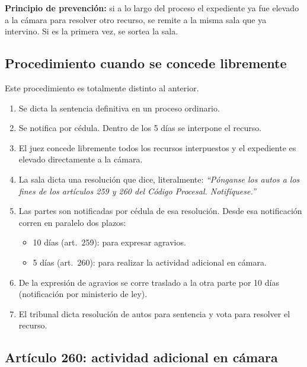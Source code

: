\documentclass[12pt,oneside]{book}
\begin{document}
\begin{note}
\textbf{Principio de prevenci\'on:} si a lo largo del proceso el expediente ya fue elevado a la c\'amara para resolver otro recurso, se remite a la misma sala que ya intervino. Si es la primera vez, se sortea la sala.
\end{note}

\subsection{Procedimiento cuando se concede libremente}

Este procedimiento es totalmente distinto al anterior.

\begin{enumerate}
    \item Se dicta la sentencia definitiva en un proceso ordinario.
    \item Se notifica por c\'edula. Dentro de los 5 d\'ias se interpone el recurso.
    \item El juez concede libremente todos los recursos interpuestos y el expediente es elevado directamente a la c\'amara.
    \item La sala dicta una resoluci\'on que dice, literalmente: \textit{``P\'onganse los autos a los fines de los art\'iculos 259 y 260 del C\'odigo Procesal. Notif\'iquese.''}
    \item Las partes son notificadas por c\'edula de esa resoluci\'on. Desde esa notificaci\'on corren en paralelo dos plazos:
    \begin{itemize}
        \item 10 d\'ias (art.~259): para expresar agravios.
        \item 5 d\'ias (art.~260): para realizar la actividad adicional en c\'amara.
    \end{itemize}
    \item De la expresi\'on de agravios se corre traslado a la otra parte por 10 d\'ias (notificaci\'on por ministerio de ley).
    \item El tribunal dicta resoluci\'on de autos para sentencia y vota para resolver el recurso.
\end{enumerate}

\subsection{Art\'iculo 260: actividad adicional en c\'amara}
\end{document}
